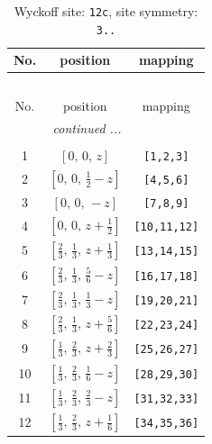 \documentclass[fleqn,8pt]{jsarticle}
\begin{document}
\begin{longtable}{ccc}
\caption{Wyckoff site: {\tt 12c}, site symmetry: {\tt 3..}}
 \\
 \hline \hline
No. & position & mapping \\ \hline \endfirsthead

\multicolumn{2}{l}{\tablename\ \thetable{}} \\
 \hline \hline
No. & position & mapping \\ \hline \endhead

 \hline \hline
\multicolumn{2}{r}{\footnotesize\it continued ...} \\ \endfoot

 \hline \hline
\multicolumn{2}{r}{} \\ \endlastfoot

1 & $\left[ 0,\, 0,\, z \right]$ & {\tt [1,2,3]} \\ \hline
2 & $\left[ 0,\, 0,\, \frac{1}{2} - z \right]$ & {\tt [4,5,6]} \\ \hline
3 & $\left[ 0,\, 0,\, - z \right]$ & {\tt [7,8,9]} \\ \hline
4 & $\left[ 0,\, 0,\, z + \frac{1}{2} \right]$ & {\tt [10,11,12]} \\ \hline
5 & $\left[ \frac{2}{3},\, \frac{1}{3},\, z + \frac{1}{3} \right]$ & {\tt [13,14,15]} \\ \hline
6 & $\left[ \frac{2}{3},\, \frac{1}{3},\, \frac{5}{6} - z \right]$ & {\tt [16,17,18]} \\ \hline
7 & $\left[ \frac{2}{3},\, \frac{1}{3},\, \frac{1}{3} - z \right]$ & {\tt [19,20,21]} \\ \hline
8 & $\left[ \frac{2}{3},\, \frac{1}{3},\, z + \frac{5}{6} \right]$ & {\tt [22,23,24]} \\ \hline
9 & $\left[ \frac{1}{3},\, \frac{2}{3},\, z + \frac{2}{3} \right]$ & {\tt [25,26,27]} \\ \hline
10 & $\left[ \frac{1}{3},\, \frac{2}{3},\, \frac{1}{6} - z \right]$ & {\tt [28,29,30]} \\ \hline
11 & $\left[ \frac{1}{3},\, \frac{2}{3},\, \frac{2}{3} - z \right]$ & {\tt [31,32,33]} \\ \hline
12 & $\left[ \frac{1}{3},\, \frac{2}{3},\, z + \frac{1}{6} \right]$ & {\tt [34,35,36]} \\
\end{longtable}
\renewcommand{\arraystretch}{1.2}
\end{document}

